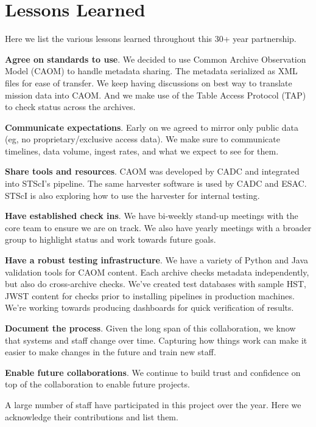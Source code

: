 \documentclass[11pt,twoside]{article}
\begin{document}
\section{Lessons Learned}

Here we list the various lessons learned throughout this 30+ year partnership.

\textbf{Agree on standards to use}. 
We decided to use Common Archive Observation Model (CAOM) to handle metadata sharing. 
The metadata serialized as XML files for ease of transfer. 
We keep having discussions on best way to translate mission data into CAOM. 
And we make use of the Table Access Protocol (TAP) to check status across the archives.

\textbf{Communicate expectations}.
Early on we agreed to mirror only public data (eg, no proprietary/exclusive access data). 
We make sure to communicate timelines, data volume, ingest rates, and what we expect to see for them. 

\textbf{Share tools and resources}. 
CAOM was developed by CADC and integrated into STScI's pipeline.
The same harvester software is used by CADC and ESAC. 
STScI is also exploring how to use the harvester for internal testing.

\textbf{Have established check ins}.
We have bi-weekly stand-up meetings with the core team to ensure we are on track. 
We also have yearly meetings with a broader group to highlight status and work towards future goals.

\textbf{Have a robust testing infrastructure}.
We have a variety of Python and Java validation tools for CAOM content. 
Each archive checks metadata independently, but also do cross-archive checks. 
We've created test databases with sample HST, JWST content for checks prior to installing pipelines in production machines.
We're working towards producing dashboards for quick verification of results.

\textbf{Document the process}.
Given the long span of this collaboration, we know that systems and staff change over time. 
Capturing how things work can make it easier to make changes in the future and train new staff.

\textbf{Enable future collaborations}.
We continue to build trust and confidence on top of the collaboration to enable future projects.

\acknowledgements 

A large number of staff have participated in this project over the year. 
Here we acknowledge their contributions and list them.
\end{document}
